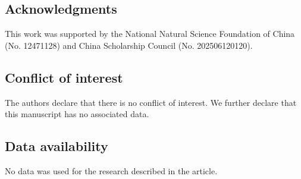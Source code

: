 \documentclass[reqno,10pt]{amsart}
\numberwithin{equation}{section}
\begin{document}
\subsection*{Acknowledgments}
This work was supported by the National Natural Science Foundation of China (No. 12471128) and China Scholarship Council (No. 202506120120). 


\subsection*{Conflict of interest} The authors declare that there is no conflict of interest. We further declare that this manuscript has no associated data.
	
\subsection*{Data availability}
No data was used for the research described in the article.
	
\end{document}
